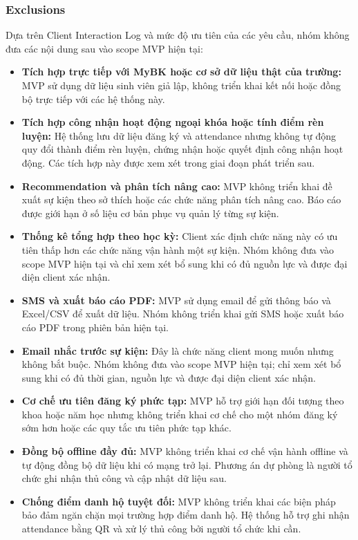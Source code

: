 \subsubsection{Exclusions}

Dựa trên Client Interaction Log và mức độ ưu tiên của các yêu cầu, nhóm không đưa các nội dung sau vào scope MVP hiện tại:

\begin{itemize}
\item \textbf{Tích hợp trực tiếp với MyBK hoặc cơ sở dữ liệu thật của trường:} MVP sử dụng dữ liệu sinh viên giả lập, không triển khai kết nối hoặc đồng bộ trực tiếp với các hệ thống này.

\item \textbf{Tích hợp công nhận hoạt động ngoại khóa hoặc tính điểm rèn luyện:} Hệ thống lưu dữ liệu đăng ký và attendance nhưng không tự động quy đổi thành điểm rèn luyện, chứng nhận hoặc quyết định công nhận hoạt động. Các tích hợp này được xem xét trong giai đoạn phát triển sau.

\item \textbf{Recommendation và phân tích nâng cao:} MVP không triển khai đề xuất sự kiện theo sở thích hoặc các chức năng phân tích nâng cao. Báo cáo được giới hạn ở số liệu cơ bản phục vụ quản lý từng sự kiện.

\item \textbf{Thống kê tổng hợp theo học kỳ:} Client xác định chức năng này có ưu tiên thấp hơn các chức năng vận hành một sự kiện. Nhóm không đưa vào scope MVP hiện tại và chỉ xem xét bổ sung khi có đủ nguồn lực và được đại diện client xác nhận.

\item \textbf{SMS và xuất báo cáo PDF:} MVP sử dụng email để gửi thông báo và Excel/CSV để xuất dữ liệu. Nhóm không triển khai gửi SMS hoặc xuất báo cáo PDF trong phiên bản hiện tại.

\item \textbf{Email nhắc trước sự kiện:} Đây là chức năng client mong muốn nhưng không bắt buộc. Nhóm không đưa vào scope MVP hiện tại; chỉ xem xét bổ sung khi có đủ thời gian, nguồn lực và được đại diện client xác nhận.

\item \textbf{Cơ chế ưu tiên đăng ký phức tạp:} MVP hỗ trợ giới hạn đối tượng theo khoa hoặc năm học nhưng không triển khai cơ chế cho một nhóm đăng ký sớm hơn hoặc các quy tắc ưu tiên phức tạp khác.

\item \textbf{Đồng bộ offline đầy đủ:} MVP không triển khai cơ chế vận hành offline và tự động đồng bộ dữ liệu khi có mạng trở lại. Phương án dự phòng là người tổ chức ghi nhận thủ công và cập nhật dữ liệu sau.

\item \textbf{Chống điểm danh hộ tuyệt đối:} MVP không triển khai các biện pháp bảo đảm ngăn chặn mọi trường hợp điểm danh hộ. Hệ thống hỗ trợ ghi nhận attendance bằng QR và xử lý thủ công bởi người tổ chức khi cần.
\end{itemize}

